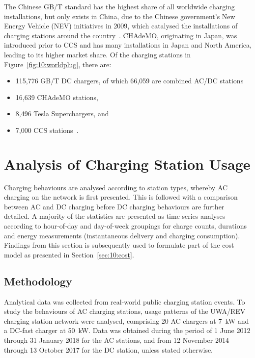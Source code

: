The Chinese GB/T standard has the highest share of all worldwide charging installations, but only exists in China, due to the Chinese government's New Energy Vehicle (NEV) initiatives in 2009, which catalysed the installations of charging stations around the country~\cite{ji_plug-electric_2018}. CHAdeMO, originating in Japan, was introduced prior to CCS and has many installations in Japan and North America, leading to its higher market share. Of the charging stations in Figure~\ref{fig:10:worldplug}, there are:
\begin{itemize}
	\item 115,776 GB/T DC chargers, of which 66,059 are combined AC/DC stations~\cite{china_electric_vehicle_charging_infrastructure_promotion_alliance_zhongguo_2017}
	\item 16,639 CHAdeMO stations,
	\item 8,496 Tesla Superchargers, and
	\item 7,000 CCS stations~\cite{steitz_plug_2018}.
\end{itemize}


\section{Analysis of Charging Station Usage}
\label{sec:10:analysis}
Charging behaviours are analysed according to station types, whereby AC charging on the network is first presented. This is followed with a comparison between AC and DC charging before DC charging behaviours are further detailed. A majority of the statistics are presented as time series analyses according to hour-of-day and day-of-week groupings for charge counts, durations and energy measurements (instantaneous delivery and charging consumption). Findings from this section is subsequently used to formulate part of the cost model as presented in Section~\ref{sec:10:cost}.

\subsection{Methodology}
Analytical data was collected from real-world public charging station events. To study the behaviours of AC charging stations, usage patterns of the UWA/REV charging station network were analysed, comprising 20 AC chargers at 7~kW and a DC-fast charger at 50~kW. Data was obtained during the period of 1 June 2012 through 31 January 2018 for the AC stations, and from 12 November 2014 through 13 October 2017 for the DC station, unless stated otherwise. %

